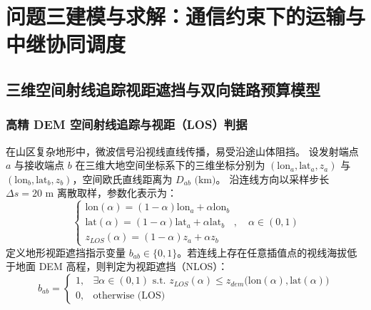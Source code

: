 \section{问题三建模与求解：通信约束下的运输与中继协同调度}

\subsection{三维空间射线追踪视距遮挡与双向链路预算模型}

\subsubsection{高精 DEM 空间射线追踪与视距（LOS）判据}
在山区复杂地形中，微波信号沿视线直线传播，易受沿途山体阻挡。
设发射端点 $a$ 与接收端点 $b$ 在三维大地空间坐标系下的三维坐标分别为 $(\text{lon}_a, \text{lat}_a, z_a)$ 与 $(\text{lon}_b, \text{lat}_b, z_b)$，空间欧氏直线距离为 $D_{ab}\text{ (km)}$。
沿连线方向以采样步长 $\Delta s = 20\text{ m}$ 离散取样，参数化表示为：
\begin{equation}
    \begin{cases}
        \text{lon}(\alpha) = (1 - \alpha) \text{lon}_a + \alpha \text{lon}_b \\
        \text{lat}(\alpha) = (1 - \alpha) \text{lat}_a + \alpha \text{lat}_b \\
        z_{LOS}(\alpha) = (1 - \alpha) z_a + \alpha z_b
    \end{cases}, \quad \alpha \in (0, 1)
    \label{eq:ray_tracing}
\end{equation}
定义地形视距遮挡指示变量 $b_{ab} \in \{0, 1\}$。若连线上存在任意插值点的视线海拔低于地面 DEM 高程，则判定为视距遮挡（NLOS）：
\begin{equation}
    b_{ab} = \begin{cases}
        1, & \exists \alpha \in (0, 1) \text{ s.t. } z_{LOS}(\alpha) \le z_{dem}\big(\text{lon}(\alpha), \text{lat}(\alpha)\big) \\
        0, & \text{otherwise (LOS)}
    \end{cases}
    \label{eq:nlos_indicator}
\end{equation}

